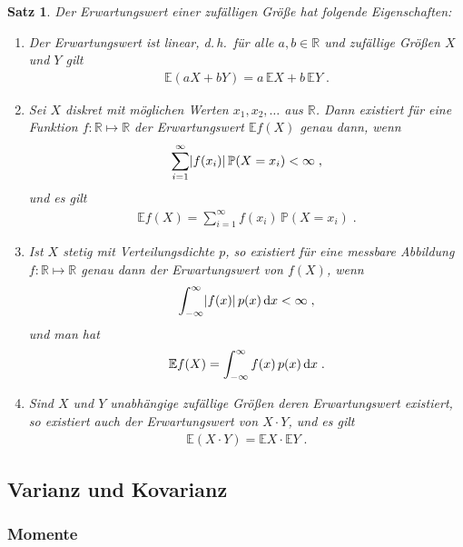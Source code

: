 \documentclass[ngerman,draft,parskip=half,twoside]{scrartcl}
\newtheorem{thm}{Satz}[section]
\DeclarePairedDelimiter{\abs}{\lvert}{\rvert}
\newcommand*{\R}{\mathbb{R}}      %
\newcommand*{\E}{\mathbb{E}}        %
\newcommand*{\WKM}{\mathbb{P}}      %
\newcommand*{\diff}[1]{%
  \mathop{\mathrm{\mathstrut d}}%
  \ifx#1(\else%
  \ifx#1[\else%
  \ifx#1\{\else%
    \!%
  \fi\fi\fi#1%
}
\begin{document}
\begin{thm}
  Der Erwartungswert einer zufälligen Größe hat folgende Eigenschaften:
  \begin{enumerate}
   \item Der Erwartungswert ist linear, d.\,h.~für alle $a,b\in\R$ und
    zufällige Größen $X$ und $Y$ gilt
    \begin{gather*}
      \E(a X+ b Y) = a\,\E X + b\,\E Y\;.
    \end{gather*}

   \item Sei $X$ diskret mit möglichen Werten $x_1,x_2,\dotsc$ aus $\R$. Dann
    existiert für eine Funktion $f \colon\R\mapsto\R$ der Erwartungswert $\E
    f(X)$ genau dann, wenn
    \begin{gather*}
      \sum_{i=1}^\infty \abs{f(x_i)}\,\WKM(X=x_i)<\infty\;,
    \end{gather*}
    und es gilt
    \begin{gather*}
      \E f(X)=\sum_{i=1}^\infty f(x_i)\,\WKM(X=x_i)\;.
    \end{gather*}

   \item Ist $X$ stetig mit Verteilungsdichte $p$, so existiert für eine
    messbare Abbildung $f \colon\R\mapsto\R$ genau dann der Erwartungswert von
    $f(X)$, wenn
    \begin{gather*}
      \int_{-\infty}^\infty \abs{f(x)}\,p(x)\diff{x}<\infty\;,
    \end{gather*}
    und man hat
    \begin{gather*}
      \E f(X)=\int_{-\infty}^\infty  f(x)\,p(x)\diff{x}\;.
    \end{gather*}

   \item Sind $X$ und $Y$ unabhängige zufällige Größen deren Erwartungswert
    existiert, so existiert auch der Erwartungswert von $X\cdot Y$, und es gilt
    \begin{gather*}
      \E(X\cdot Y)= \E X \cdot \E Y\;.
    \end{gather*}
  \end{enumerate}
\end{thm}

\subsection{Varianz und Kovarianz}
\subsubsection{Momente}
\end{document}
